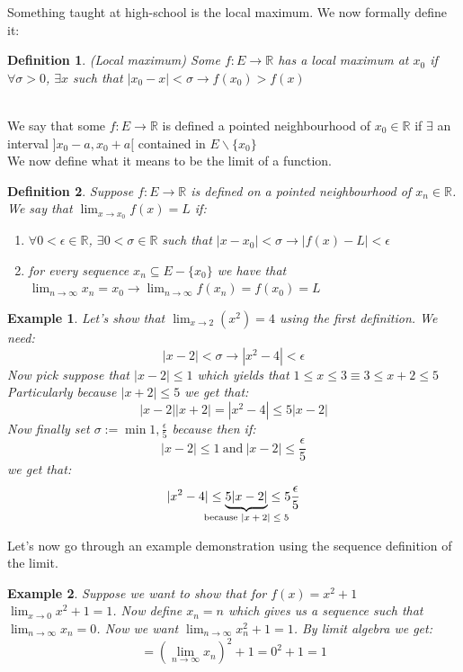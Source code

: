\documentclass[titlepage]{article}
\newtheorem{definition}{Definition}
\numberwithin{equation}{subsection}
\newtheorem{example}{Example}[section]
\begin{document}
Something taught at high-school is the local maximum. We now formally define it:

\begin{definition}(Local maximum)
Some $f:E\to\mathbb{R}$ has a local maximum at $x_{0}$ if $\forall \sigma > 0$, $\exists x$ such that $|x_{0} - x| < \sigma \rightarrow f(x_{0}) > f(x)$
\end{definition}
\\

We say that some $f:E\to\mathbb{R}$ is defined a pointed neighbourhood of $x_{0} \in \mathbb{R}$ if $\exists$ an interval $]x_{0}-a,x_{0}+a[$ contained in $E\backslash\{x_{0}\}$
\\

We now define what it means to be the limit of a function. 

\begin{definition}
Suppose $f:E\to\mathbb{R}$ is defined on a pointed neighbourhood of $x_{n}\in \mathbb{R}$. We say that $\lim_{x \to x_{0}} f(x) = L$ if:
\begin{enumerate}
    \item $\forall 0 < \epsilon \in \mathbb{R}$, $\exists 0<\sigma \in \mathbb{R} $ such that $|x - x_{0}| < \sigma \rightarrow |f(x) - L| < \epsilon$
    \item for every sequence $x_{n} \subseteq E-\{x_{0}\}$ we have that $\lim_{n\to \infty}x_{n} = x_{0} \rightarrow \lim_{n\to\infty}f(x_{n})= f(x_{0}) = L$
\end{enumerate}
\end{definition}

\begin{example}
Let's show that $\lim_{x\to 2}(x^2) = 4$ using the first definition.
We need:
$$ |x-2| < \sigma \rightarrow |x^2 - 4| < \epsilon$$
Now pick suppose that $|x-2| \leq 1 $ which yields that $ 1\leq x \leq 3 \equiv 3\leq x + 2 \leq 5$ Particularly because $|x+2| \leq 5$ we get that:
$$ |x-2||x+2| = |x^2 - 4| \leq 5|x-2|$$
Now finally set $\sigma := \min{1,\frac{\epsilon}{5}}$ because then if:
$$ |x-2| \leq 1 \ \text{and} \ |x-2| \leq \frac{\epsilon}{5}$$ we get that:
$$ |x^2 - 4| \leq \underbrace{5|x-2|}_{\text{\makebox[0pt]{because $|x+2|\leq5$}}} \leq 5\frac{\epsilon}{5}$$
\end{example}
  
Let's now go through an example demonstration using the sequence definition of the limit.

\begin{example}
Suppose we want to show that for $f(x) = x^2 + 1$ $ \lim_{x \to 0} x^2 + 1 = 1$. Now define $x_{n} = n$ which gives us a sequence such that $\lim_{n \to \infty}x_{n} = 0$. Now we want $\lim_{n \to \infty}x_{n}^{2} + 1 = 1$. By limit algebra we get:
$$ = (\lim_{n \to \infty}x_{n})^2 + 1 = 0^2 + 1 = 1$$
\end{example}
\end{document}
